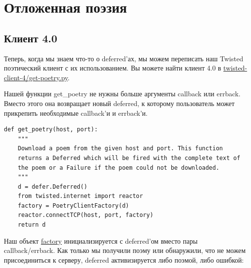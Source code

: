 
\section{Отложенная поэзия\label{sec:part8}}

\subsection{Клиент 4.0}


Теперь, когда мы знаем что-то о deferred'ах, мы можем 
переписать наш Twisted поэтический клиент с их использованием. 
Вы можете найти клиент 4.0 в 
\href{http://github.com/jdavisp3/twisted-intro/blob/master/twisted-client-4/get-poetry.py}{twisted-client-4/get-poetry.py}.


Нашей функции get\_poetry не нужны больше аргументы callback или errback. 
Вместо этого она возвращает новый deferred, к которому пользователь 
может прикрепить необходимые callback'и и errback'и.

\begin{scriptsize}\begin{verbatim}
def get_poetry(host, port):
    """
    Download a poem from the given host and port. This function
    returns a Deferred which will be fired with the complete text of
    the poem or a Failure if the poem could not be downloaded.
    """
    d = defer.Deferred()
    from twisted.internet import reactor
    factory = PoetryClientFactory(d)
    reactor.connectTCP(host, port, factory)
    return d
\end{verbatim}\end{scriptsize}
Наш объект  
\href{http://github.com/jdavisp3/twisted-intro/blob/master/twisted-client-4/get-poetry.py#L65}{factory}  
инициализируется с deferred'ом 
вместо пары  callback/errback. Как только мы получили поэму или 
обнаружили, что не можем присоединиться к серверу, deferred 
активизируется либо поэмой, либо ошибкой: 

